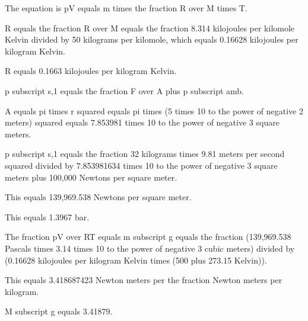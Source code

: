 The equation is pV equals m times the fraction R over M times T.

R equals the fraction R over M equals the fraction 8.314 kilojoules per kilomole Kelvin divided by 50 kilograms per kilomole, which equals 0.16628 kilojoules per kilogram Kelvin.

R equals 0.1663 kilojoules per kilogram Kelvin.

p subscript s,1 equals the fraction F over A plus p subscript amb.

A equals pi times r squared equals pi times (5 times 10 to the power of negative 2 meters) squared equals 7.853981 times 10 to the power of negative 3 square meters.

p subscript s,1 equals the fraction 32 kilograms times 9.81 meters per second squared divided by 7.853981634 times 10 to the power of negative 3 square meters plus 100,000 Newtons per square meter.

This equals 139,969.538 Newtons per square meter.

This equals 1.3967 bar.

The fraction pV over RT equals m subscript g equals the fraction (139,969.538 Pascals times 3.14 times 10 to the power of negative 3 cubic meters) divided by (0.16628 kilojoules per kilogram Kelvin times (500 plus 273.15 Kelvin)).

This equals 3.418687423 Newton meters per the fraction Newton meters per kilogram.

M subscript g equals 3.41879.